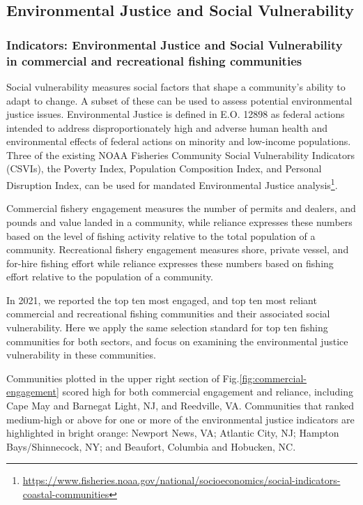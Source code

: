 \documentclass[
  10pt,
]{article}
\begin{document}
\hypertarget{environmental-justice-and-social-vulnerability}{%
\subsection{Environmental Justice and Social
Vulnerability}\label{environmental-justice-and-social-vulnerability}}

\hypertarget{indicators-environmental-justice-and-social-vulnerability-in-commercial-and-recreational-fishing-communities}{%
\subsubsection{Indicators: Environmental Justice and Social
Vulnerability in commercial and recreational fishing
communities}\label{indicators-environmental-justice-and-social-vulnerability-in-commercial-and-recreational-fishing-communities}}

Social vulnerability measures social factors that shape a community's
ability to adapt to change. A subset of these can be used to assess
potential environmental justice issues. Environmental Justice is defined
in E.O. 12898 as federal actions intended to address disproportionately
high and adverse human health and environmental effects of federal
actions on minority and low-income populations. Three of the existing
NOAA Fisheries Community Social Vulnerability Indicators (CSVIs), the
Poverty Index, Population Composition Index, and Personal Disruption
Index, can be used for mandated Environmental Justice
analysis\footnote{\url{https://www.fisheries.noaa.gov/national/socioeconomics/social-indicators-coastal-communities}}.

Commercial fishery engagement measures the number of permits and
dealers, and pounds and value landed in a community, while reliance
expresses these numbers based on the level of fishing activity relative
to the total population of a community. Recreational fishery engagement
measures shore, private vessel, and for-hire fishing effort while
reliance expresses these numbers based on fishing effort relative to the
population of a community.

In 2021, we reported the top ten most engaged, and top ten most reliant
commercial and recreational fishing communities and their associated
social vulnerability. Here we apply the same selection standard for top
ten fishing communities for both sectors, and focus on examining the
environmental justice vulnerability in these communities.

Communities plotted in the upper right section of
Fig.\ref{fig:commercial-engagement} scored high for both commercial
engagement and reliance, including Cape May and Barnegat Light, NJ, and
Reedville, VA. Communities that ranked medium-high or above for one or
more of the environmental justice indicators are highlighted in bright
orange: Newport News, VA; Atlantic City, NJ; Hampton Bays/Shinnecock,
NY; and Beaufort, Columbia and Hobucken, NC.
\end{document}
